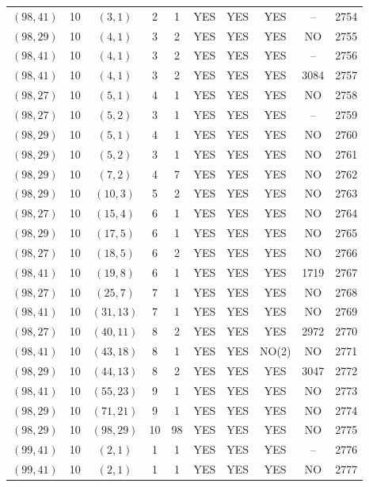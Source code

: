 \begin{longtable}{|c|c|c|c|c|c|c|c|c|c|}
$(98, 41)$ & 10 & $(3, 1)$ & 2 & 1 & YES & YES & YES & -- & 2754\\
$(98, 29)$ & 10 & $(4, 1)$ & 3 & 2 & YES & YES & YES & NO & 2755\\
$(98, 41)$ & 10 & $(4, 1)$ & 3 & 2 & YES & YES & YES & -- & 2756\\
$(98, 41)$ & 10 & $(4, 1)$ & 3 & 2 & YES & YES & YES & 3084 & 2757\\
$(98, 27)$ & 10 & $(5, 1)$ & 4 & 1 & YES & YES & YES & NO & 2758\\
$(98, 27)$ & 10 & $(5, 2)$ & 3 & 1 & YES & YES & YES & -- & 2759\\
$(98, 29)$ & 10 & $(5, 1)$ & 4 & 1 & YES & YES & YES & NO & 2760\\
$(98, 29)$ & 10 & $(5, 2)$ & 3 & 1 & YES & YES & YES & NO & 2761\\
$(98, 29)$ & 10 & $(7, 2)$ & 4 & 7 & YES & YES & YES & NO & 2762\\
$(98, 29)$ & 10 & $(10, 3)$ & 5 & 2 & YES & YES & YES & NO & 2763\\
$(98, 27)$ & 10 & $(15, 4)$ & 6 & 1 & YES & YES & YES & NO & 2764\\
$(98, 29)$ & 10 & $(17, 5)$ & 6 & 1 & YES & YES & YES & NO & 2765\\
$(98, 27)$ & 10 & $(18, 5)$ & 6 & 2 & YES & YES & YES & NO & 2766\\
$(98, 41)$ & 10 & $(19, 8)$ & 6 & 1 & YES & YES & YES & 1719 & 2767\\
$(98, 27)$ & 10 & $(25, 7)$ & 7 & 1 & YES & YES & YES & NO & 2768\\
$(98, 41)$ & 10 & $(31, 13)$ & 7 & 1 & YES & YES & YES & NO & 2769\\
$(98, 27)$ & 10 & $(40, 11)$ & 8 & 2 & YES & YES & YES & 2972 & 2770\\
$(98, 41)$ & 10 & $(43, 18)$ & 8 & 1 & YES & YES & NO(2) & NO & 2771\\
$(98, 29)$ & 10 & $(44, 13)$ & 8 & 2 & YES & YES & YES & 3047 & 2772\\
$(98, 41)$ & 10 & $(55, 23)$ & 9 & 1 & YES & YES & YES & NO & 2773\\
$(98, 29)$ & 10 & $(71, 21)$ & 9 & 1 & YES & YES & YES & NO & 2774\\
$(98, 29)$ & 10 & $(98, 29)$ & 10 & 98 & YES & YES & YES & NO & 2775\\
$(99, 41)$ & 10 & $(2, 1)$ & 1 & 1 & YES & YES & YES & -- & 2776\\
$(99, 41)$ & 10 & $(2, 1)$ & 1 & 1 & YES & YES & YES & NO & 2777\\

\end{longtable}
